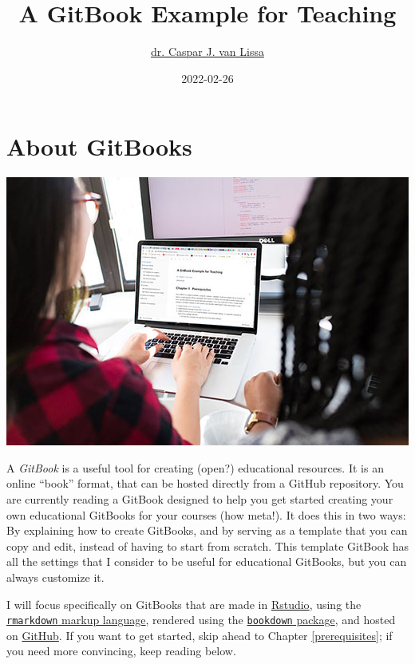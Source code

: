 \documentclass[
]{book}
\title{A GitBook Example for Teaching}
\author{\href{https://www.uu.nl/staff/CJvanLissa}{dr. Caspar J. van Lissa}}
\date{2022-02-26}
\begin{document}
\maketitle

{
\setcounter{tocdepth}{1}
\tableofcontents
}
\hypertarget{about-gitbooks}{%
\chapter{About GitBooks}\label{about-gitbooks}}

\includegraphics{./img/using_gitbook.jpeg}

A \emph{GitBook} is a useful tool for creating (open?) educational resources. It is an online ``book'' format, that can be hosted directly from a GitHub repository. You are currently reading a GitBook designed to help you get started creating your own educational GitBooks for your courses (how meta!). It does this in two ways: By explaining how to create GitBooks, and by serving as a template that you can copy and edit, instead of having to start from scratch. This template GitBook has all the settings that I consider to be useful for educational GitBooks, but you can always customize it.

I will focus specifically on GitBooks that are made in \href{https://rstudio.com}{Rstudio}, using the \href{https://rstudio.com/wp-content/uploads/2016/03/rmarkdown-cheatsheet-2.0.pdf}{\texttt{rmarkdown} markup language}, rendered using the \href{https://bookdown.org/yihui/bookdown/get-started.html}{\texttt{bookdown} package}, and hosted on \href{https://github.com/}{GitHub}. If you want to get started, skip ahead to Chapter \ref{prerequisites}; if you need more convincing, keep reading below.
\end{document}
